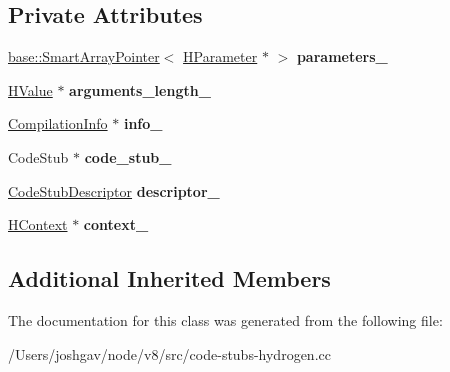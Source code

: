 \subsection*{Private Attributes}
\begin{DoxyCompactItemize}
\item 
\hyperlink{classv8_1_1base_1_1_smart_array_pointer}{base\+::\+Smart\+Array\+Pointer}$<$ \hyperlink{classv8_1_1internal_1_1_h_parameter}{H\+Parameter} $\ast$ $>$ {\bfseries parameters\+\_\+}\hypertarget{classv8_1_1internal_1_1_code_stub_graph_builder_base_ac86caaa42ef1f88da9490f56e6a1228d}{}\label{classv8_1_1internal_1_1_code_stub_graph_builder_base_ac86caaa42ef1f88da9490f56e6a1228d}

\item 
\hyperlink{classv8_1_1internal_1_1_h_value}{H\+Value} $\ast$ {\bfseries arguments\+\_\+length\+\_\+}\hypertarget{classv8_1_1internal_1_1_code_stub_graph_builder_base_a4befd569659a496885dc02f51171fae8}{}\label{classv8_1_1internal_1_1_code_stub_graph_builder_base_a4befd569659a496885dc02f51171fae8}

\item 
\hyperlink{classv8_1_1internal_1_1_compilation_info}{Compilation\+Info} $\ast$ {\bfseries info\+\_\+}\hypertarget{classv8_1_1internal_1_1_code_stub_graph_builder_base_a647023e6d83ae8c347f1f344344c2f71}{}\label{classv8_1_1internal_1_1_code_stub_graph_builder_base_a647023e6d83ae8c347f1f344344c2f71}

\item 
Code\+Stub $\ast$ {\bfseries code\+\_\+stub\+\_\+}\hypertarget{classv8_1_1internal_1_1_code_stub_graph_builder_base_a0d24792069cb43d0f6b7b793d103d059}{}\label{classv8_1_1internal_1_1_code_stub_graph_builder_base_a0d24792069cb43d0f6b7b793d103d059}

\item 
\hyperlink{classv8_1_1internal_1_1_code_stub_descriptor}{Code\+Stub\+Descriptor} {\bfseries descriptor\+\_\+}\hypertarget{classv8_1_1internal_1_1_code_stub_graph_builder_base_a352381aaed26581047104240e03b58bf}{}\label{classv8_1_1internal_1_1_code_stub_graph_builder_base_a352381aaed26581047104240e03b58bf}

\item 
\hyperlink{classv8_1_1internal_1_1_h_context}{H\+Context} $\ast$ {\bfseries context\+\_\+}\hypertarget{classv8_1_1internal_1_1_code_stub_graph_builder_base_af3cafa099b33f99502ca55f6616a8585}{}\label{classv8_1_1internal_1_1_code_stub_graph_builder_base_af3cafa099b33f99502ca55f6616a8585}

\end{DoxyCompactItemize}
\subsection*{Additional Inherited Members}


The documentation for this class was generated from the following file\+:\begin{DoxyCompactItemize}
\item 
/\+Users/joshgav/node/v8/src/code-\/stubs-\/hydrogen.\+cc\end{DoxyCompactItemize}
